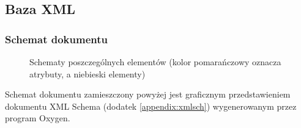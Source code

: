 \subsection{Baza XML}

\subsubsection{Schemat dokumentu}

\begin{figure}[h]
 \centering
 \caption{Schematy poszczególnych elementów (kolor pomarańczowy oznacza atrybuty, a niebieski elementy)}
\end{figure}



Schemat dokumentu zamieszczony powyżej jest graficznym przedstawieniem dokumentu XML Schema (dodatek \ref{appendix:xmlsch}) 
wygenerowanym przez program Oxygen.

